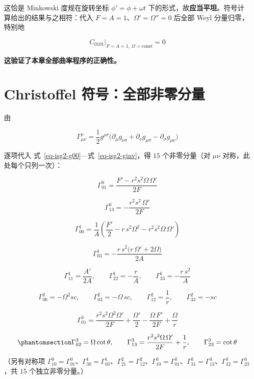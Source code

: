 \documentclass[
  chinese,
  a4paper,
  UTF8,
  12pt,
  oneside,
  openany]{ctexbook}
\theoremstyle{plain}
\theoremstyle{plain}
\theoremstyle{plain}
\theoremstyle{definition}
\theoremstyle{plain}
\theoremstyle{plain}
\theoremstyle{remark}
\begin{document}
这恰是 Minkowski 度规在旋转坐标 \(\phi'=\phi+\omega t\)
下的形式，故\textbf{应当平坦}。符号计算给出的结果与之相符：代入
\(F=A=1\)、\(\Omega'=\Omega''=0\) 后全部 Weyl 分量归零，特别地

\[
C_{0101}\bigr|_{F=A=1,\ \Omega=\text{const}}=0
\]

\textbf{这验证了本章全部曲率程序的正确性。}

\section{Christoffel 符号：全部非零分量}\label{sec-isg2-christoffel}

由

\[
\Gamma^{\rho}_{\mu\nu}=\frac{1}{2}g^{\rho\sigma}
\bigl(\partial_\mu g_{\nu\sigma}+\partial_\nu g_{\mu\sigma}-\partial_\sigma g_{\mu\nu}\bigr)
\]

逐项代入 式~\ref{eq-isg2-g00}---式~\ref{eq-isg2-ginv}，得 \(15\)
个非零分量（对 \(\mu\nu\) 对称，此处每个只列一次）：

\[
\Gamma^{0}_{01}=\frac{F'-r^{2}s^{2}\Omega\,\Omega'}{2F}
\]

\[
\Gamma^{0}_{13}=-\frac{r^{2}s^{2}\,\Omega'}{2F}
\]

\[
\Gamma^{1}_{00}=\frac{1}{A}\left(\frac{F'}{2}-r\,s^{2}\Omega^{2}-r^{2}s^{2}\Omega\,\Omega'\right)
\]

\[
\Gamma^{1}_{03}=-\frac{r\,s^{2}\bigl(r\,\Omega'+2\Omega\bigr)}{2A}
\]

\[
\Gamma^{1}_{11}=\frac{A'}{2A},\qquad
\Gamma^{1}_{22}=-\frac{r}{A},\qquad
\Gamma^{1}_{33}=-\frac{r\,s^{2}}{A}
\]

\[
\Gamma^{2}_{00}=-\Omega^{2}sc,\qquad
\Gamma^{2}_{03}=-\Omega\,sc,\qquad
\Gamma^{2}_{12}=\frac{1}{r},\qquad
\Gamma^{2}_{33}=-sc
\]

\[
\Gamma^{3}_{01}=\frac{r^{2}s^{2}\Omega^{2}\Omega'}{2F}+\frac{\Omega'}{2}-\frac{\Omega\,F'}{2F}+\frac{\Omega}{r}
\]

\begin{equation}\protect\phantomsection\label{eq-isg2-gamma}{
\Gamma^{3}_{02}=\Omega\cot\theta,\qquad
\Gamma^{3}_{13}=\frac{r^{2}s^{2}\Omega\,\Omega'}{2F}+\frac{1}{r},\qquad
\Gamma^{3}_{23}=\cot\theta
}\end{equation}

（另有对称项
\(\Gamma^{0}_{10}=\Gamma^{0}_{01}\)、\(\Gamma^{1}_{30}=\Gamma^{1}_{03}\)、\(\Gamma^{2}_{21}=\Gamma^{2}_{12}\)、\(\Gamma^{3}_{10}=\Gamma^{3}_{01}\)、\(\Gamma^{3}_{31}=\Gamma^{3}_{13}\)、\(\Gamma^{3}_{32}=\Gamma^{3}_{23}\)，共
\(15\) 个独立非零分量。）
\end{document}
